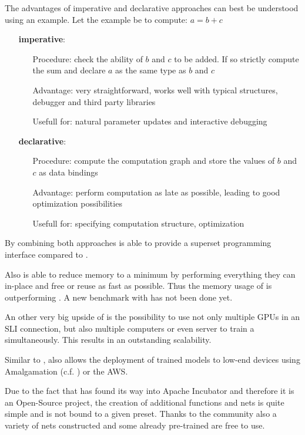 The advantages of imperative and declarative approaches can best be understood using an example.
Let the example be to compute: $a = b+c$
\begin{itemize}
	\item[] \textbf{imperative}:
		\begin{itemize}
			\setlength{\itemindent}{1.5cm}
			\item[Procedure:] check the ability of $b$ and $c$ to be added. If so strictly compute the sum and declare $a$ as the same type as $b$ and $c$
			\item[Advantage:] very straightforward, works well with typical structures, debugger and third party libraries
			\item[Usefull for:] natural parameter updates and interactive debugging
		\end{itemize}
	\item[] \textbf{declarative}:
		\begin{itemize}
			\setlength{\itemindent}{1.5cm}
			\item[Procedure:] compute the computation graph and store the values of $b$ and $c$ as data bindings
			\item[Advantage:] perform computation as late as possible, leading to good optimization possibilities
			\item[Usefull for:] specifying computation structure, optimization
		\end{itemize}
\end{itemize}

By combining both approaches \mxnet is able to provide a superset programming interface compared to \caffe. \cite{chen2015mxnet}

Also \mxnet is able to reduce memory to a minimum by performing everything they can in-place and free or reuse as fast as possible. Thus the memory usage of \mxnet is outperforming \caffe. \cite{chen2015mxnet} %
A new benchmark with \caffetwo has not been done yet.

An other very big upside of \mxnet is the possibility to use not only multiple GPUs in an SLI connection, but also multiple computers or even server to train a \nn simultaneously. This results in an outstanding scalability. \cite{chen2015mxnet}

Similar to \caffetwo, \mxnet also allows the deployment of trained models to low-end devices using Amalgamation (c.f. \cite{MxNetHomepage}) or the AWS.

Due to the fact that \mxnet has found its way into Apache Incubator and therefore it is an Open-Source project, the creation of additional functions and nets is quite simple and is not bound to a given preset. Thanks to the community also a variety of nets constructed and some already pre-trained are free to use. \cite{MxNetGithubModelGallery}

